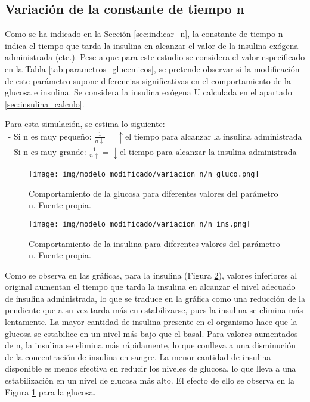 \subsection{Variación de la constante de tiempo n}

Como se ha indicado en la Sección \ref{sec:indicar_n}, la constante de tiempo n indica el tiempo que tarda la insulina en alcanzar el valor de la insulina exógena administrada (cte.). Pese a que para este estudio se considera el valor especificado en la Tabla \ref{tab:parametros_glucemicos}, se pretende observar si la modificación de este parámetro supone diferencias significativas en el comportamiento de la glucosa e insulina.  Se considera la insulina exógena U calculada en el apartado \ref{sec:insulina_calculo}.

Para esta simulación, se estima lo siguiente:
\begin{align}
    \text{- Si n es muy pequeño: } \frac{1}{n \downarrow} =  \uparrow \text{el tiempo para alcanzar la insulina administrada}\\
    \text{- Si n es muy grande: } \frac{1}{n \uparrow} =  \downarrow \text{el tiempo para alcanzar la insulina administrada}
\end{align}

\clearpage
\begin{figure}[htbp]
    \centering
    \texttt{[image: img/modelo\_modificado/variacion\_n/n\_gluco.png]}
    \caption{Comportamiento de la glucosa para diferentes valores del parámetro n. Fuente propia.}
    \label{fig:n_gluc_bergm_mod}
\end{figure}
\begin{figure}[htbp]
    \centering
    \texttt{[image: img/modelo\_modificado/variacion\_n/n\_ins.png]}
    \caption{Comportamiento de la insulina para diferentes valores del parámetro n. Fuente propia.}
    \label{fig:n_ins_bergm_mod}
\end{figure}

Como se observa en las gráficas, para la insulina (Figura \ref{fig:n_ins_bergm_mod}), valores inferiores al original aumentan el tiempo que tarda la insulina en alcanzar el nivel adecuado de insulina administrada, lo que se traduce en la gráfica como una reducción de la pendiente que a su vez tarda más en estabilizarse, pues la insulina se elimina más lentamente. La mayor cantidad de insulina presente en el organismo hace que la glucosa se estabilice en un nivel más bajo que el basal. Para valores aumentados de n, la insulina se elimina más rápidamente, lo que conlleva a una disminución de la concentración de insulina en sangre. La menor cantidad de insulina disponible es menos efectiva en reducir los niveles de glucosa, lo que lleva a una estabilización en un nivel de glucosa más alto. El efecto de ello se observa en la Figura \ref{fig:n_gluc_bergm_mod} para la glucosa.



